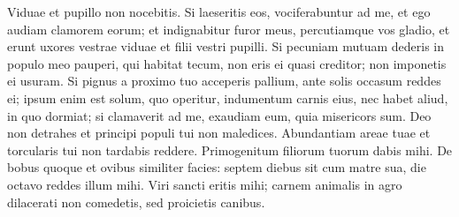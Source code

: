\begin{biblechapter}
\begin{biblechapter}
\begin{biblechapter}
\begin{biblechapter}
\begin{biblechapter}
\begin{biblechapter}
\begin{biblechapter}
\begin{biblechapter}
\begin{biblechapter}
\begin{biblechapter}
\begin{biblechapter}
\begin{biblechapter}
\begin{biblechapter}
\begin{biblechapter}
\begin{biblechapter}
\begin{biblechapter}
\begin{biblechapter}
\begin{biblechapter}
\begin{biblechapter}
\begin{biblechapter}
\begin{biblechapter}
\begin{biblechapter}
 \verse Viduae et pupillo non nocebitis. 
\verse Si laeseritis eos, vociferabuntur ad me, et ego audiam clamorem eorum; 
\verse et indignabitur furor meus, percutiamque vos gladio, et erunt uxores vestrae viduae et filii vestri pupilli.
 \verse Si pecuniam mutuam dederis in populo meo pauperi, qui habitat tecum, non eris ei quasi creditor; non imponetis ei usuram.
 \verse Si pignus a proximo tuo acceperis pallium, ante solis occasum reddes ei; 
 \verse ipsum enim est solum, quo operitur, indumentum carnis eius, nec habet aliud, in quo dormiat; si clamaverit ad me, exaudiam eum, quia misericors sum.
 \verse Deo non detrahes et principi populi tui non maledices.
 \verse Abundantiam areae tuae et torcularis tui non tardabis reddere.
 Primogenitum filiorum tuorum dabis mihi.
 \verse De bobus quoque et ovibus similiter facies: septem diebus sit cum matre sua, die octavo reddes illum mihi.
 \verse Viri sancti eritis mihi; carnem animalis in agro dilacerati non comedetis, sed proicietis canibus.
 

\end{biblechapter}
\end{biblechapter}
\end{biblechapter}
\end{biblechapter}
\end{biblechapter}
\end{biblechapter}
\end{biblechapter}
\end{biblechapter}
\end{biblechapter}
\end{biblechapter}
\end{biblechapter}
\end{biblechapter}
\end{biblechapter}
\end{biblechapter}
\end{biblechapter}
\end{biblechapter}
\end{biblechapter}
\end{biblechapter}
\end{biblechapter}
\end{biblechapter}
\end{biblechapter}
\end{biblechapter}
